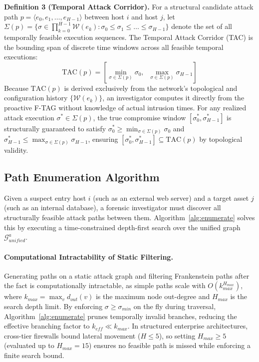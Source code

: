 \documentclass[12pt]{article}
\begin{document}
\textbf{Definition 3 (Temporal Attack Corridor).} For a structural candidate attack path $p = \langle e_0, e_1, \dots, e_{H-1} \rangle$ between host $i$ and host $j$, let $\Sigma(p) = \{ \sigma \in \prod_{k=0}^{H-1} \mathcal{W}(e_k) : \sigma_0 \le \sigma_1 \le \dots \le \sigma_{H-1} \}$ denote the set of all temporally feasible execution sequences. The Temporal Attack Corridor (TAC) is the bounding span of discrete time windows across all feasible temporal executions:
\begin{equation}\label{eq:tac}
\text{TAC}(p) = \left[ \min_{\sigma \in \Sigma(p)} \sigma_0,\;\;\max_{\sigma \in \Sigma(p)} \sigma_{H-1} \right]
\end{equation}
Because $\text{TAC}(p)$ is derived exclusively from the network's topological and configuration history $\{\mathcal{W}(e_k)\}$, an investigator computes it directly from the proactive F-TAG without knowledge of actual intrusion times. For any realized attack execution $\sigma^* \in \Sigma(p)$, the true compromise window $[\sigma_0^*, \sigma_{H-1}^*]$ is structurally guaranteed to satisfy $\sigma_0^* \ge \min_{\sigma \in \Sigma(p)} \sigma_0$ and $\sigma_{H-1}^* \le \max_{\sigma \in \Sigma(p)} \sigma_{H-1}$, ensuring $[\sigma_0^*, \sigma_{H-1}^*] \subseteq \text{TAC}(p)$ by topological validity.

\subsection{Path Enumeration Algorithm}\label{sec:enumeration}

Given a suspect entry host $i$ (such as an external web server) and a target asset $j$ (such as an internal database), a forensic investigator must discover all structurally feasible attack paths between them. Algorithm~\ref{alg:enumerate} solves this by executing a time-constrained depth-first search over the unified graph $\mathcal{G}^a_{unified}$.

\paragraph{Computational Intractability of Static Filtering.}
Generating paths on a static attack graph and filtering Frankenstein paths after the fact is computationally intractable, as simple paths scale with $O(k_{max}^{H_{max}})$, where $k_{max} = \max_{v} d_{out}(v)$ is the maximum node out-degree and $H_{max}$ is the search depth limit. By enforcing $\sigma \ge \sigma_{min}$ on the fly during traversal, Algorithm~\ref{alg:enumerate} prunes temporally invalid branches, reducing the effective branching factor to $k_{eff} \ll k_{max}$. In structured enterprise architectures, cross-tier firewalls bound lateral movement ($H \le 5$), so setting $H_{max} \ge 5$ (evaluated up to $H_{max} = 15$) ensures no feasible path is missed while enforcing a finite search bound.
\end{document}
